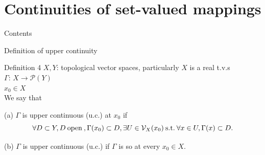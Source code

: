 \documentclass[aspectratio=169, dvipdfmx, 11pt]{beamer} %
\newcommand{\SuchThat}{\:\text{s.t.}\:}
\begin{document}
\section{Continuities of set-valued mappings}
\begin{frame}{Contents}
  \tableofcontents[currentsection]
\end{frame}

\begin{frame}[t]{Definition of upper continuity}
  \begin{block}{Definition 4}
    $X, Y$: topological vector spaces, particularly $X$ is a real t.v.s\\
    $\Gamma$: $X \rightarrow \mathcal{P}(Y)$ \\
    $x_0 \in X$ \\
    \medskip
    We say that

    (a) $\Gamma$ is upper continuous (u.c.) at $x_0$ if
    \begin{equation}
      \forall D \subset Y, D \:\text{open}\:, \Gamma (x_0) \subset D, \exists U \in \mathcal{V}_{X}(x_0) \SuchThat \forall x \in U, \Gamma (x) \subset D. \notag
    \end{equation}

    (b) $\Gamma$ is upper continuous (u.c.) if $\Gamma$ is so at every $x_0 \in X$.
  \end{block}
\end{frame}
\end{document}
